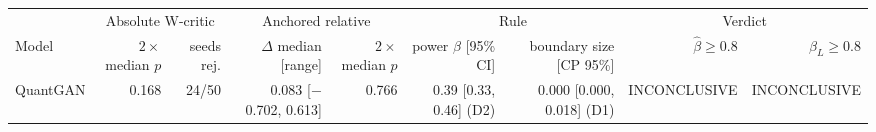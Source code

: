 \begin{tabular}{lrrrrrrrr}
\toprule
 & \multicolumn{2}{c}{Absolute W-critic} & \multicolumn{2}{c}{Anchored relative} & \multicolumn{2}{c}{Rule} & \multicolumn{2}{c}{Verdict} \\
\cmidrule(lr){2-3} \cmidrule(lr){4-5} \cmidrule(lr){6-7} \cmidrule(lr){8-9}
Model & $2\times$median $p$ & seeds rej. & $\Delta$ median [range] & $2\times$median $p$ & power $\hat\beta$ [95\% CI] & boundary size [CP 95\%] & $\hat\beta\ge0.8$ & $\beta_L\ge0.8$ \\
\midrule
QuantGAN & 0.168 & 24/50 & 0.083 [$-$0.702, 0.613] & 0.766 & 0.39 [0.33, 0.46] (D2) & 0.000 [0.000, 0.018] (D1) & INCONCLUSIVE & INCONCLUSIVE \\
\bottomrule
\end{tabular}
